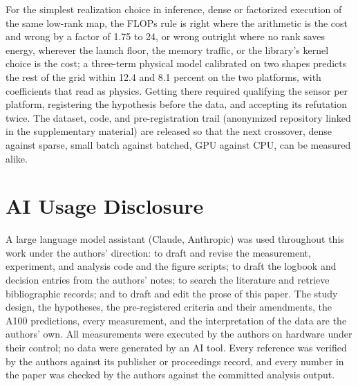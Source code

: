 \documentclass{article}
\begin{document}
For the simplest realization choice in inference, dense or factorized execution of the same low-rank map, the FLOPs rule is right where the arithmetic is the cost and wrong by a factor of 1.75 to 24, or wrong outright where no rank saves energy, wherever the launch floor, the memory traffic, or the library's kernel choice is the cost; a three-term physical model calibrated on two shapes predicts the rest of the grid within 12.4 and 8.1 percent on the two platforms, with coefficients that read as physics. Getting there required qualifying the sensor per platform, registering the hypothesis before the data, and accepting its refutation twice. The dataset, code, and pre-registration trail (anonymized repository linked in the supplementary material) are released so that the next crossover, dense against sparse, small batch against batched, GPU against CPU, can be measured alike.




\section*{AI Usage Disclosure}
A large language model assistant (Claude, Anthropic) was used throughout this work under the authors' direction: to draft and revise the measurement, experiment, and analysis code and the figure scripts; to draft the logbook and decision entries from the authors' notes; to search the literature and retrieve bibliographic records; and to draft and edit the prose of this paper. The study design, the hypotheses, the pre-registered criteria and their amendments, the A100 predictions, every measurement, and the interpretation of the data are the authors' own. All measurements were executed by the authors on hardware under their control; no data were generated by an AI tool. Every reference was verified by the authors against its publisher or proceedings record, and every number in the paper was checked by the authors against the committed analysis output.

\ifdefined\NOAPPENDIX\else

\fi
\end{document}
